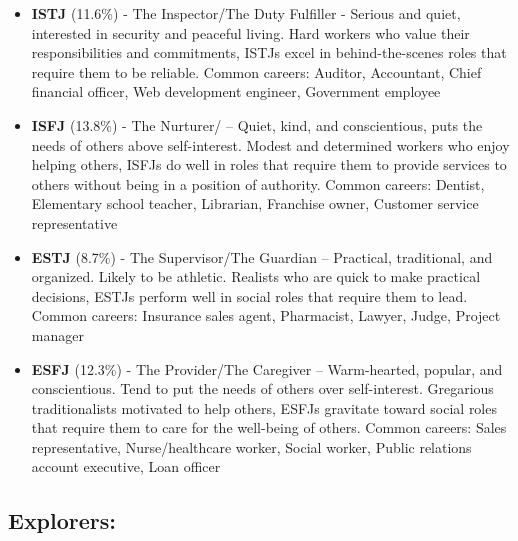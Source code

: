 \documentclass[]{book}
\begin{document}
\begin{itemize}
\item
  \textbf{ISTJ} (11.6\%) - The Inspector/The Duty Fulfiller - Serious and quiet, interested in security and peaceful living. Hard workers who value their responsibilities and commitments, ISTJs excel in behind-the-scenes roles that require them to be reliable. Common careers: Auditor, Accountant, Chief financial officer, Web development engineer, Government employee
\item
  \textbf{ISFJ} (13.8\%) - The Nurturer/ -- Quiet, kind, and conscientious, puts the needs of others above self-interest. Modest and determined workers who enjoy helping others, ISFJs do well in roles that require them to provide services to others without being in a position of authority. Common careers: Dentist, Elementary school teacher, Librarian, Franchise owner, Customer service representative
\item
  \textbf{ESTJ} (8.7\%) - The Supervisor/The Guardian -- Practical, traditional, and organized. Likely to be athletic. Realists who are quick to make practical decisions, ESTJs perform well in social roles that require them to lead. Common careers: Insurance sales agent, Pharmacist, Lawyer, Judge, Project manager
\item
  \textbf{ESFJ} (12.3\%) - The Provider/The Caregiver -- Warm-hearted, popular, and conscientious. Tend to put the needs of others over self-interest. Gregarious traditionalists motivated to help others, ESFJs gravitate toward social roles that require them to care for the well-being of others. Common careers: Sales representative, Nurse/healthcare worker, Social worker, Public relations account executive, Loan officer
\end{itemize}

\hypertarget{explorers}{%
\subsection{Explorers:}\label{explorers}}
\end{document}
